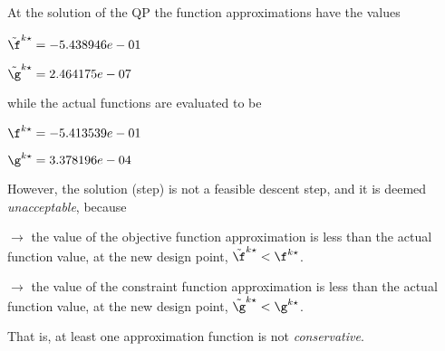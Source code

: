 At the solution of the QP the function approximations have the values

$\tilde \f^{k\star} = -5.438946e-01$

$\tilde \g^{k\star} =  2.464175e-07$

\bigskip
while the actual functions are evaluated to be

$\f^{k\star} = -5.413539e-01$

$\g^{k\star} =  3.378196e-04$

\bigskip
 However, the solution (step)                         is not a feasible descent step, and it is deemed                         \emph{unacceptable}, because 
 
$\to$ the value of the objective                             function approximation is less than the actual function                             value, at the new design point,                             $\tilde {\f}^{k\star} < {\f}^{k\star}$.

 $\to$ the value of the constraint function                             approximation is less than the actual function value, at                             the new design point, $\tilde {\g}^{k\star} < {\g}^{k\star}$.

 \bigskip 

 That is, at least one approximation                         function is not \emph{conservative}.
